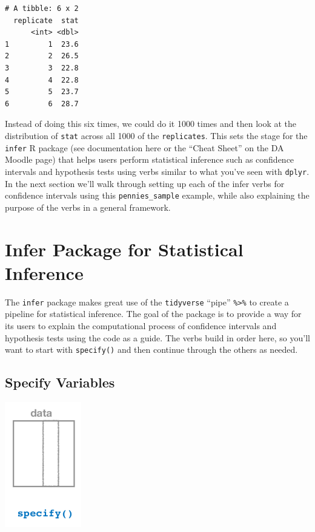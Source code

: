 \documentclass[]{article}
\begin{document}
\begin{verbatim}
# A tibble: 6 x 2
  replicate  stat
      <int> <dbl>
1         1  23.6
2         2  26.5
3         3  22.8
4         4  22.8
5         5  23.7
6         6  28.7
\end{verbatim}

Instead of doing this six times, we could do it 1000 times and then look
at the distribution of \texttt{stat} across all 1000 of the
\texttt{replicates}. This sets the stage for the \texttt{infer} R
package (see documentation here or the ``Cheat Sheet'' on the DA Moodle
page) that helps users perform statistical inference such as confidence
intervals and hypothesis tests using verbs similar to what you've seen
with \texttt{dplyr}. In the next section we'll walk through setting up
each of the infer verbs for confidence intervals using this
\texttt{pennies\_sample} example, while also explaining the purpose of
the verbs in a general framework.

\section{Infer Package for Statistical Inference}\label{sec:Infer}

The \texttt{infer} package makes great use of the \texttt{tidyverse}
``pipe'' \texttt{\%\textgreater{}\%} to create a pipeline for
statistical inference. The goal of the package is to provide a way for
its users to explain the computational process of confidence intervals
and hypothesis tests using the code as a guide. The verbs build in order
here, so you'll want to start with \texttt{specify()} and then continue
through the others as needed.

\subsection{Specify Variables}\label{specify-variables}

\begin{center}
\includegraphics[width=0.25\textwidth]{specify.png}
\end{center}
\end{document}
